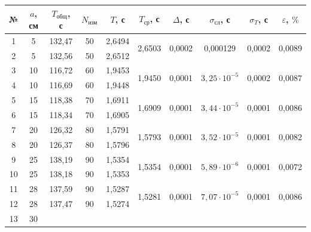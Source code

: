 \documentclass[a4paper,12pt]{article} %
\begin{document}
\begin{table}[h!!]
	\begin{center}
		\begin{tabular}{|c|c|c|c|c|c|c|c|c|c|}
		\hline
		№ &
		$ a $, см &
		$ T_\text{общ} $, с &
		$ N_\text{изм} $ &
		$ T $, с &
		$ T_\text{ср} $, с &
		$ \Delta $, с &
		$ \sigma_\text{сл} $, с &
		$ \sigma_T$, с &
		$ \varepsilon $, $ \% $ \\ \hline
		1 &
		5 &
		132,47 &
		50 &
		2,6494 &
		\multirow{2}{*}{2,6503} &
		\multirow{2}{*}{0,0002} &
		\multirow{2}{*}{0,000129} &
		\multirow{2}{*}{0,0002} &
		\multirow{2}{*}{0,0089} \\ \cline{1-5}
		2 &
		5 &
		132,56 &
		50 &
		2,6512 &
		&
		&
		&
		&
		\\ \hline
		3 &
		10 &
		116,72 &
		60 &
		1,9453 &
		\multirow{2}{*}{1,9450} &
		\multirow{2}{*}{0,0001} &
		\multirow{2}{*}{$3,25 \cdot 10^{-5}$} &
		\multirow{2}{*}{0,0002} &
		\multirow{2}{*}{0,0087} \\ \cline{1-5}
		4 &
		10 &
		116,69 &
		60 &
		1,9448 &
		&
		&
		&
		&
		\\ \hline
		5 &
		15 &
		118,38 &
		70 &
		1,6911 &
		\multirow{2}{*}{1,6909} &
		\multirow{2}{*}{0,0001} &
		\multirow{2}{*}{$3,44 \cdot 10^{-5}$} &
		\multirow{2}{*}{0,0001} &
		\multirow{2}{*}{0,0086} \\ \cline{1-5}
		6 &
		15 &
		118,34 &
		70 &
		1,6905 &
		&
		&
		&
		&
		\\ \hline
		7 &
		20 &
		126,32 &
		80 &
		1,5791 &
		\multirow{2}{*}{1,5793} &
		\multirow{2}{*}{0,0001} &
		\multirow{2}{*}{$3,52 \cdot 10^{-5}$} &
		\multirow{2}{*}{0,0001} &
		\multirow{2}{*}{0,0082} \\ \cline{1-5}
		8 &
		20 &
		126,37 &
		80 &
		1,5796 &
		&
		&
		&
		&
		\\ \hline
		9 &
		25 &
		138,19 &
		90 &
		1,5354 &
		\multirow{2}{*}{1,5354} &
		\multirow{2}{*}{0,0001} &
		\multirow{2}{*}{$5,89 \cdot 10^{-6}$} &
		\multirow{2}{*}{0,0001} &
		\multirow{2}{*}{0,0072} \\ \cline{1-5}
		10 &
		25 &
		138,18 &
		90 &
		1,5353 &
		&
		&
		&
		&
		\\ \hline
		11 &
		28 &
		137,59 &
		90 &
		1,5287 &
		\multirow{2}{*}{1,5281} &
		\multirow{2}{*}{0,0001} &
		\multirow{2}{*}{$7,07 \cdot 10^{-5}$} &
		\multirow{2}{*}{0,0001} &
		\multirow{2}{*}{0,0086} \\ \cline{1-5}
		12 &
		28 &
		137,47 &
		90 &
		1,5274 &
		&
		&
		&
		&
		\\ \hline
		13 &
		30 &

\end{tabular}
\end{center}
\end{table}
\end{document}
